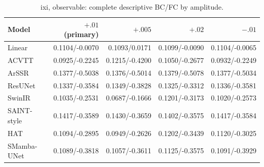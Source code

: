 \begin{table}[t]\centering\scriptsize

\caption{ixi, observable: complete descriptive BC/FC by amplitude.}

\begin{tabular}{lrrrr}\toprule Model & $+.01$ (primary) & $+.005$ & $+.02$ & $-.01$\\\midrule

Linear & 0.1104/-0.0070 & 0.1093/0.0171 & 0.1099/-0.0090 & 0.1104/-0.0065\\

ACVTT & 0.0925/-0.2245 & 0.1215/-0.4200 & 0.1050/-0.2677 & 0.0932/-0.2249\\

ArSSR & 0.1377/-0.5038 & 0.1376/-0.5014 & 0.1379/-0.5078 & 0.1377/-0.5034\\

ResUNet & 0.1337/-0.3584 & 0.1349/-0.3828 & 0.1325/-0.3312 & 0.1336/-0.3581\\

SwinIR & 0.1035/-0.2531 & 0.0687/-0.1666 & 0.1201/-0.3173 & 0.1020/-0.2573\\

SAINT-style & 0.1417/-0.3589 & 0.1430/-0.3659 & 0.1402/-0.3575 & 0.1417/-0.3584\\

HAT & 0.1094/-0.2895 & 0.0949/-0.2626 & 0.1202/-0.3439 & 0.1120/-0.3025\\

SMamba-UNet & 0.1089/-0.3818 & 0.1057/-0.3611 & 0.1125/-0.3575 & 0.1091/-0.3929\\

\bottomrule\end{tabular}\end{table}

